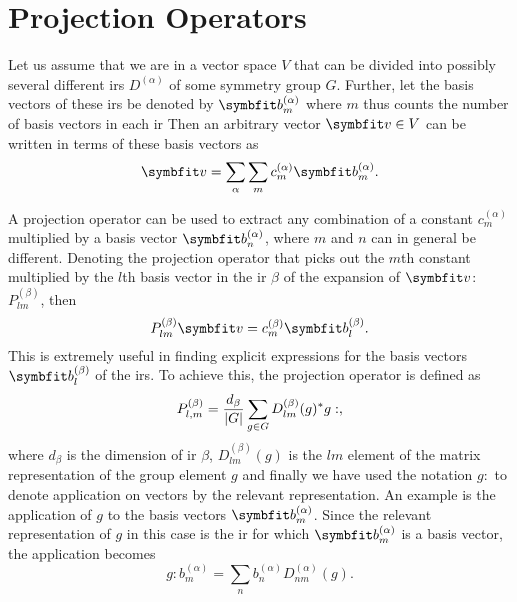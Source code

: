 \section{Projection Operators}
\label{sec:Group:Pro}

Let us assume that we are in a vector space $V$ that can be divided into possibly several different \ac{ir}s $D^{(\alpha)}$ of some
symmetry group $G$. Further, let the basis vectors of these \ac{ir}s be denoted by $\v{b}^{(\alpha)}_m$ where $m$ thus counts the number
of basis vectors in each \ac{ir} Then an arbitrary vector $\v{v}\in V$ can be written in terms of these basis vectors as
\begin{equation}
    \label{eq:Group:Irr:Pro:basisDecomp}
    \v{v} = \sum_\alpha\sum_m c_m^{(\alpha)}\v{b}^{(\alpha)}_m.
\end{equation}

A projection operator can be used to extract any combination of a constant $c_m^{(\alpha)}$ multiplied by a basis vector $\v{b}^{(\alpha)}_n$, where
$m$ and $n$ can in general be different. Denoting the projection operator that picks out the $m$th constant multiplied by the $l$th basis vector
in the \ac{ir} $\beta$ of the expansion of $\v{v}$: $P^{(\beta)}_{lm}$, then
\begin{equation}
    \label{eq:Group:Irr:Pro:generalProApplication}
    P^{(\beta)}_{lm}\v{v} = c_m^{(\beta)}\v{b}_l^{(\beta)}.
\end{equation}
This is extremely useful in finding explicit expressions for the basis vectors $\v{b}_l^{(\beta)}$ of the \ac{ir}s.
To achieve this, the projection operator is defined as
\begin{equation}
    \label{eq:Group:Irr:Pro:proOpDef}
    P^{(\beta)}_{l,m} = \frac{d_\beta}{\lvert G \rvert}\sum_{g\in G}D_{lm}^{(\beta)}(g)^\ast g:,
\end{equation}
where $d_\beta$ is the dimension of \ac{ir} $\beta$, $D_{lm}^{(\beta)}(g)$ is the $lm$ element of the matrix representation of the group element $g$ and
finally we have used the notation $g:$ to denote application on vectors by the relevant representation. An example is the application of $g$ to the
basis vectors $\v{b}_m^{(\alpha)}$. Since the relevant representation of $g$ in this case is the \ac{ir} for which $\v{b}_m^{(\alpha)}$ is
a basis vector, the application becomes
\begin{equation}
    \label{eq:Group:Irr:Pro:gApplication}
    g : b_m^{(\alpha)} = \sum_nb_n^{(\alpha)}D_{nm}^{(\alpha)}(g).
\end{equation}

